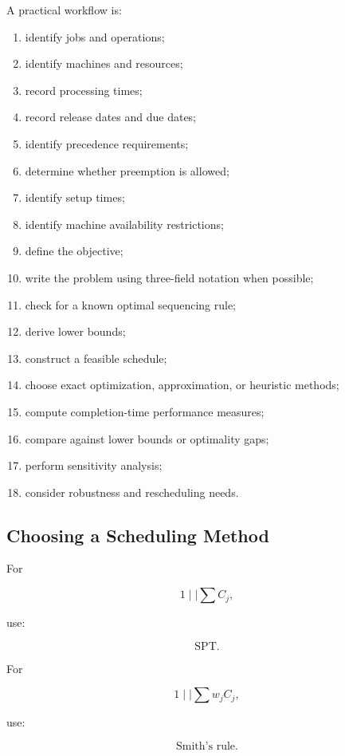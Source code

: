 A practical workflow is:

\begin{enumerate}
    \item identify jobs and operations;
    \item identify machines and resources;
    \item record processing times;
    \item record release dates and due dates;
    \item identify precedence requirements;
    \item determine whether preemption is allowed;
    \item identify setup times;
    \item identify machine availability restrictions;
    \item define the objective;
    \item write the problem using three-field notation when possible;
    \item check for a known optimal sequencing rule;
    \item derive lower bounds;
    \item construct a feasible schedule;
    \item choose exact optimization, approximation, or heuristic methods;
    \item compute completion-time performance measures;
    \item compare against lower bounds or optimality gaps;
    \item perform sensitivity analysis;
    \item consider robustness and rescheduling needs.
\end{enumerate}

\subsection{Choosing a Scheduling Method}
\label{subsec:choosing-scheduling-method}

For

\[
1\mid\mid\sum C_j,
\]

use:

\[
\boxed{
\text{SPT}.
}
\]

For

\[
1\mid\mid\sum w_jC_j,
\]

use:

\[
\boxed{
\text{Smith's rule}.
}
\]

